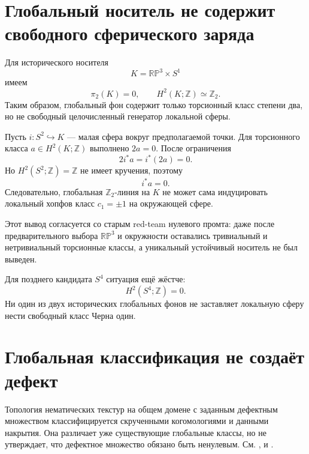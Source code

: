 \section{Глобальный носитель не содержит свободного сферического заряда}

Для исторического носителя
\begin{equation}
 K=\mathbb{RP}^3\times S^1
\end{equation}
имеем
\begin{equation}
 \pi_2(K)=0,
 \qquad
 H^2(K;\mathbb Z)\simeq\mathbb Z_2.
 \label{eq:v5-sector-selection-carrier-groups}
\end{equation}
Таким образом, глобальный фон содержит только торсионный класс степени два,
но не свободный целочисленный генератор локальной сферы.

Пусть $i:S^2\hookrightarrow K$ --- малая сфера вокруг предполагаемой
точки. Для торсионного класса $a\in H^2(K;\mathbb Z)$ выполнено $2a=0$.
После ограничения
\begin{equation}
 2i^*a=i^*(2a)=0.
\end{equation}
Но $H^2(S^2;\mathbb Z)=\mathbb Z$ не имеет кручения, поэтому
\begin{equation}
 i^*a=0.
 \label{eq:v5-sector-selection-torsion-restriction}
\end{equation}
Следовательно, глобальная $\mathbb Z_2$-линия на $K$ не может сама
индуцировать локальный хопфов класс $c_1=\pm1$ на окружающей сфере.

Этот вывод согласуется со старым red-team нулевого промта: даже после
предварительного выбора $\mathbb{RP}^3$ и окружности оставались тривиальный
и нетривиальный торсионные классы, а уникальный устойчивый носитель не был
выведен.

Для позднего кандидата $S^4$ ситуация ещё жёстче:
\begin{equation}
 H^2(S^4;\mathbb Z)=0.
\end{equation}
Ни один из двух исторических глобальных фонов не заставляет локальную
сферу нести свободный класс Черна один.

\section{Глобальная классификация не создаёт дефект}

Топология нематических текстур на общем домене с заданным дефектным
множеством классифицируется скрученными когомологиями и данными накрытия.
Она различает уже существующие глобальные классы, но не утверждает, что
дефектное множество обязано быть ненулевым. См.
,  и
.

